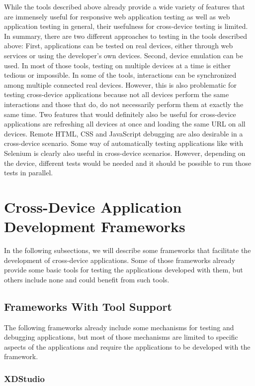 While the tools described above already provide a wide variety of features that are immensely useful for responsive web application testing as well as web application testing in general, their usefulness for cross-device testing is limited. In summary, there are two different approaches to testing in the tools described above: First, applications can be tested on real devices, either through web services or using the developer's own devices. Second, device emulation can be used. In most of those tools, testing on multiple devices at a time is either tedious or impossible. In some of the tools, interactions can be synchronized among multiple connected real devices. However, this is also problematic for testing cross-device applications because not all devices perform the same interactions and those that do, do not necessarily perform them at exactly the same time. Two features that would definitely also be useful for cross-device applications are refreshing all devices at once and loading the same URL on all devices. Remote HTML, CSS and JavaScript debugging are also desirable in a cross-device scenario. Some way of automatically testing applications like with Selenium is clearly also useful in cross-device scenarios. However, depending on the device, different tests would be needed and it should be possible to run those tests in parallel.

\section{Cross-Device Application Development Frameworks}

In the following subsections, we will describe some frameworks that facilitate the development of cross-device applications. Some of those frameworks already provide some basic tools for testing the applications developed with them, but others include none and could benefit from such tools.

\subsection{Frameworks With Tool Support}

The following frameworks already include some mechanisms for testing and debugging applications, but most of those mechanisms are limited to specific aspects of the applications and require the applications to be developed with the framework.

\subsubsection{XDStudio}

